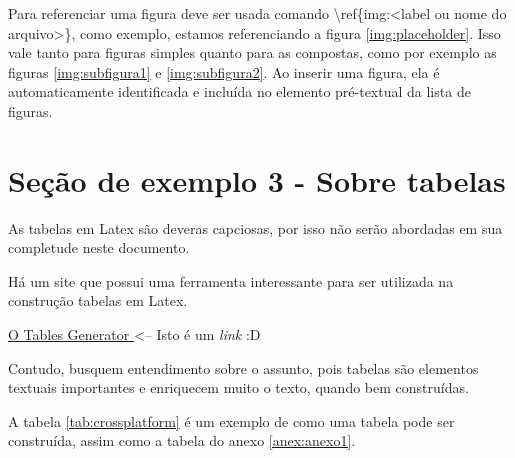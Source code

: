 
Para referenciar uma figura deve ser usada comando \textbackslash ref\{img:<label ou nome do arquivo>\}, como exemplo, estamos referenciando a figura \ref{img:placeholder}. Isso vale tanto para figuras simples quanto para as compostas, como por exemplo as figuras \ref{img:subfigura1} e \ref{img:subfigura2}. Ao inserir uma figura, ela é automaticamente identificada e incluída no elemento pré-textual da lista de figuras.




\section{Seção de exemplo 3 - Sobre tabelas}

As tabelas em Latex são deveras capciosas, por isso não serão abordadas em sua completude neste documento.

Há um site que possui uma ferramenta interessante para ser utilizada na construção tabelas em Latex.

\centerline{\href{https://www.tablesgenerator.com/}{ O Tables Generator } <-- Isto é um \textit{link} :D}

Contudo, busquem entendimento sobre o assunto, pois tabelas são elementos textuais importantes e enriquecem muito o texto, quando bem construídas.

A tabela \ref{tab:crossplatform} é um exemplo de como uma tabela pode ser construída, assim como a tabela do anexo \ref{anex:anexo1}.


